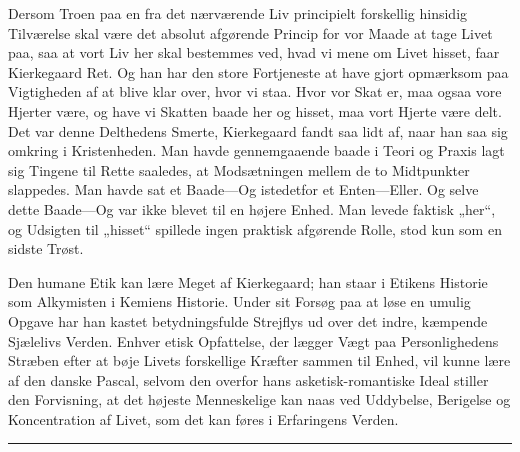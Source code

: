 \documentclass[12pt,a4paper,openany]{book}
\newcommand{\opage}[1]{\marginnote{\footnotesize\textit{[#1]}}}
\begin{document}
Dersom Troen paa en fra det nærværende Liv principielt forskellig hinsidig
Tilværelse skal være det absolut afgørende Princip for vor Maade at tage Livet
paa, saa at vort Liv her skal bestemmes ved, hvad vi mene om Livet hisset, faar
Kierkegaard Ret. Og han har den store Fortjeneste at have gjort opmærksom paa
Vigtigheden af at blive klar over, hvor vi staa. Hvor vor Skat er, maa ogsaa
vore Hjerter være, og have vi Skatten baade her og hisset, maa vort Hjerte være
delt. Det var denne Delthedens Smerte, Kierkegaard fandt saa lidt af, naar han
saa sig omkring i Kristenheden. Man havde gennemgaaende baade i Teori og Praxis
lagt sig Tingene til Rette saaledes, at Modsætningen mellem de to Midtpunkter
slappedes. Man havde sat et Baade---Og istedetfor
\setcounter{footnote}{0}%
\opage{167}et Enten---Eller. Og selve dette Baade---Og var ikke blevet til en
højere Enhed. Man levede faktisk „her“, og Udsigten til „hisset“ spillede ingen
praktisk afgørende Rolle, stod kun som en sidste Trøst.

Den humane Etik kan lære Meget af Kierkegaard; han staar i Etikens Historie som
Alkymisten i Kemiens Historie. Under sit Forsøg paa at løse en umulig Opgave
har han kastet betydningsfulde Strejflys ud over det indre, kæmpende Sjælelivs
Verden. Enhver etisk Opfattelse, der lægger Vægt paa Personlighedens Stræben
efter at bøje Livets forskellige Kræfter sammen til Enhed, vil kunne lære af
den danske Pascal, selvom den overfor hans asketisk-romantiske Ideal stiller
den Forvisning, at det højeste Menneskelige kan naas ved Uddybelse, Berigelse
og Koncentration af Livet, som det kan føres i Erfaringens Verden.

\begin{center}\rule{2cm}{0.4pt}\end{center}
\end{document}
